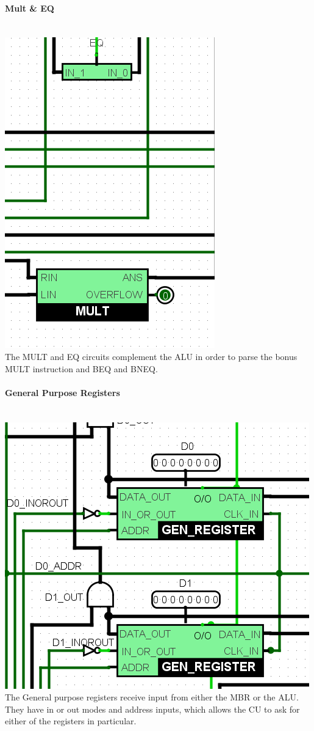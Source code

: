 \documentclass{article}
\begin{document}
	\paragraph{Mult \& EQ}~
	\\ \includegraphics[scale=0.5]{MEQ}\\ The MULT and EQ circuits complement the ALU in order to parse the bonus MULT instruction and BEQ and BNEQ.
	\paragraph{General Purpose Registers}~
	\\ \includegraphics[scale=0.5]{DR}\\The General purpose registers receive input from either the MBR or the ALU. They have in or out modes and address inputs, which allows the CU to ask for either of the registers in particular.
\end{document}
